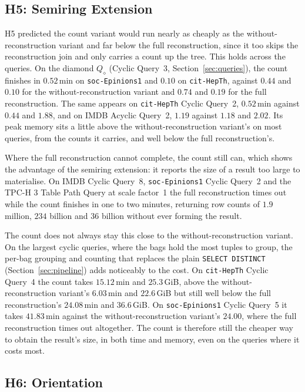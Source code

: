 \subsection{H5: Semiring Extension}
\label{sec:disc_h5}

H5 predicted the count variant would run nearly as cheaply as the without-reconstruction variant and far below the full reconstruction, since it too skips the reconstruction join and only carries a count up the tree. This holds across the queries. On the diamond $Q_\diamond$ (Cyclic Query~3, Section~\ref{sec:queries}), the count finishes in $0.52$\,min on \texttt{soc-Epinions1} and $0.10$ on \texttt{cit-HepTh}, against $0.44$ and $0.10$ for the without-reconstruction variant and $0.74$ and $0.19$ for the full reconstruction. The same appears on \texttt{cit-HepTh} Cyclic Query~2, $0.52$\,min against $0.44$ and $1.88$, and on IMDB Acyclic Query~2, $1.19$ against $1.18$ and $2.02$. Its peak memory sits a little above the without-reconstruction variant's on most queries, from the counts it carries, and well below the full reconstruction's.

Where the full reconstruction cannot complete, the count still can, which shows the advantage of the semiring extension: it reports the size of a result too large to materialise. On IMDB Cyclic Query~8, \texttt{soc-Epinions1} Cyclic Query~2 and the TPC-H 3 Table Path Query at scale factor~1 the full reconstruction times out while the count finishes in one to two minutes, returning row counts of $1.9$ million, $234$ billion and $36$ billion without ever forming the result.

The count does not always stay this close to the without-reconstruction variant. On the largest cyclic queries, where the bags hold the most tuples to group, the per-bag grouping and counting that replaces the plain \texttt{SELECT DISTINCT} (Section~\ref{sec:pipeline}) adds noticeably to the cost. On \texttt{cit-HepTh} Cyclic Query~4 the count takes $15.12$\,min and $25.3$\,GiB, above the without-reconstruction variant's $6.03$\,min and $22.6$\,GiB but still well below the full reconstruction's $24.08$\,min and $36.6$\,GiB. On \texttt{soc-Epinions1} Cyclic Query~5 it takes $41.83$\,min against the without-reconstruction variant's $24.00$, where the full reconstruction times out altogether. The count is therefore still the cheaper way to obtain the result's size, in both time and memory, even on the queries where it costs most.

\subsection{H6: Orientation}
\label{sec:disc_h6}

